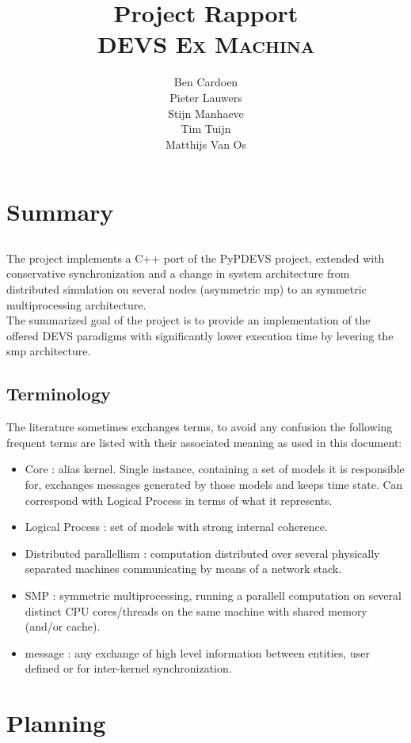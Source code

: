 \documentclass[8pt,a4paper]{report}
\title{Project Rapport\\\textsc{DEVS Ex Machina}}
\author{Ben Cardoen\\Pieter Lauwers\\Stijn Manhaeve\\Tim Tuijn\\Matthijs Van Os}
\date{}
\begin{document}
\maketitle
\tableofcontents{}

%
\chapter{Summary}
%
\section*{}
The project implements a C++ port of the PyPDEVS\cite{} project, extended with conservative synchronization and a change in system architecture from distributed simulation on several nodes (asymmetric mp) to an symmetric multiprocessing architecture. \\The summarized goal of the project is to provide an implementation of the offered DEVS paradigms with significantly lower execution time by levering the smp architecture.

\section*{Terminology}
The literature sometimes exchanges terms, to avoid any confusion the following frequent terms are listed with their associated meaning as used in this document:
\begin{itemize}
  \item Core : alias kernel. Single instance, containing a set of models it is responsible for, exchanges messages generated by those models and keeps time state. Can correspond with Logical Process in terms of what it represents.
  \item Logical Process : set of models with strong internal coherence.
  \item Distributed parallellism : computation distributed over several physically separated machines communicating by means of a network stack.
  \item SMP : symmetric multiprocessing, running a parallell computation on several distinct CPU cores/threads on the same machine with shared memory (and/or cache).
  \item message : any exchange of high level information between entities, user defined or for inter-kernel synchronization.
\end{itemize}

\chapter{Planning}
\end{document}
